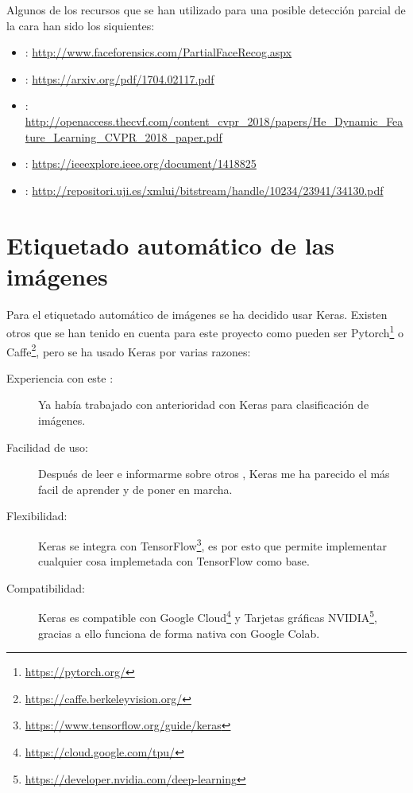 Algunos de los recursos que se han utilizado para una posible detección parcial de la cara han sido los siquientes:
\begin{itemize}
    \item {}: \url{http://www.faceforensics.com/PartialFaceRecog.aspx}
    \item {}: \url{https://arxiv.org/pdf/1704.02117.pdf}
    \item {}: \url{http://openaccess.thecvf.com/content_cvpr_2018/papers/He_Dynamic_Feature_Learning_CVPR_2018_paper.pdf}
    \item {}: \url{https://ieeexplore.ieee.org/document/1418825}
    \item {}: \url{http://repositori.uji.es/xmlui/bitstream/handle/10234/23941/34130.pdf}
\end{itemize}


\section{Etiquetado automático de las imágenes}

Para el etiquetado automático de imágenes se ha decidido usar Keras. Existen otros  que se han tenido en cuenta para este proyecto como pueden ser Pytorch\footnote{\url{https://pytorch.org/}} o Caffe\footnote{\url{https://caffe.berkeleyvision.org/}}, pero se ha usado Keras por varias razones:

\begin{description}
    \item[Experiencia con este :] Ya había trabajado con anterioridad con Keras para clasificación de imágenes.
    \item[Facilidad de uso:] Después de leer e informarme sobre otros , Keras me ha parecido el más facil de aprender y de poner en marcha.
    \item[Flexibilidad:] Keras se integra con TensorFlow\footnote{\url{https://www.tensorflow.org/guide/keras}}, es por esto que permite implementar cualquier cosa implemetada con TensorFlow como base.
    \item[Compatibilidad:] Keras es compatible con Google Cloud\footnote{\url{https://cloud.google.com/tpu/}} y Tarjetas gráficas NVIDIA\footnote{\url{https://developer.nvidia.com/deep-learning}}, gracias a ello funciona de forma nativa con Google Colab.
\end{description}

